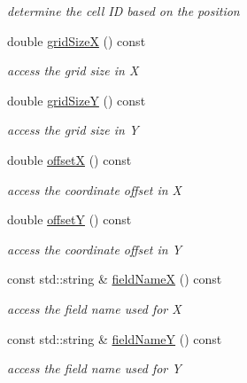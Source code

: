 \begin{DoxyCompactItemize}
\begin{DoxyCompactList}\small\item\em determine the cell ID based on the position \end{DoxyCompactList}\item 
double \hyperlink{class_d_d4hep_1_1_d_d_segmentation_1_1_cartesian_grid_x_y_a63c3cc3fdf5ac123dbd270945ca754f6}{grid\+SizeX} () const
\begin{DoxyCompactList}\small\item\em access the grid size in X \end{DoxyCompactList}\item 
double \hyperlink{class_d_d4hep_1_1_d_d_segmentation_1_1_cartesian_grid_x_y_a353429c8e77567e6bb5b84aae1c9d130}{grid\+SizeY} () const
\begin{DoxyCompactList}\small\item\em access the grid size in Y \end{DoxyCompactList}\item 
double \hyperlink{class_d_d4hep_1_1_d_d_segmentation_1_1_cartesian_grid_x_y_aef74e4a110f5105ec530912c3f88ebe9}{offsetX} () const
\begin{DoxyCompactList}\small\item\em access the coordinate offset in X \end{DoxyCompactList}\item 
double \hyperlink{class_d_d4hep_1_1_d_d_segmentation_1_1_cartesian_grid_x_y_a15bb16821ada5d8f18048ebd1ae983a4}{offsetY} () const
\begin{DoxyCompactList}\small\item\em access the coordinate offset in Y \end{DoxyCompactList}\item 
const std\+::string \& \hyperlink{class_d_d4hep_1_1_d_d_segmentation_1_1_cartesian_grid_x_y_a07b3b5a48c84b4a394a27c45956146a0}{field\+NameX} () const
\begin{DoxyCompactList}\small\item\em access the field name used for X \end{DoxyCompactList}\item 
const std\+::string \& \hyperlink{class_d_d4hep_1_1_d_d_segmentation_1_1_cartesian_grid_x_y_a3ea2a0679682cd34273e3c708daa6ef0}{field\+NameY} () const
\begin{DoxyCompactList}\small\item\em access the field name used for Y \end{DoxyCompactList}\item 

\end{DoxyCompactItemize}
